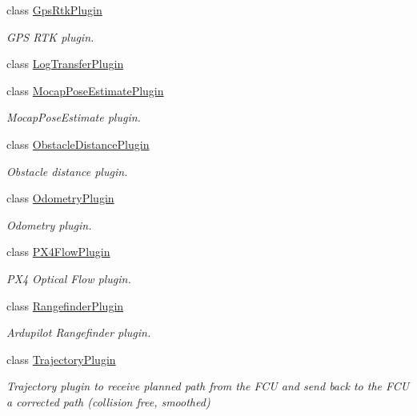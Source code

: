 \begin{DoxyCompactItemize}
class \mbox{\hyperlink{classmavros_1_1extra__plugins_1_1GpsRtkPlugin}{Gps\+Rtk\+Plugin}}
\begin{DoxyCompactList}\small\item\em G\+PS R\+TK plugin. \end{DoxyCompactList}\item 
class \mbox{\hyperlink{classmavros_1_1extra__plugins_1_1LogTransferPlugin}{Log\+Transfer\+Plugin}}
\item 
class \mbox{\hyperlink{classmavros_1_1extra__plugins_1_1MocapPoseEstimatePlugin}{Mocap\+Pose\+Estimate\+Plugin}}
\begin{DoxyCompactList}\small\item\em Mocap\+Pose\+Estimate plugin. \end{DoxyCompactList}\item 
class \mbox{\hyperlink{classmavros_1_1extra__plugins_1_1ObstacleDistancePlugin}{Obstacle\+Distance\+Plugin}}
\begin{DoxyCompactList}\small\item\em Obstacle distance plugin. \end{DoxyCompactList}\item 
class \mbox{\hyperlink{classmavros_1_1extra__plugins_1_1OdometryPlugin}{Odometry\+Plugin}}
\begin{DoxyCompactList}\small\item\em Odometry plugin. \end{DoxyCompactList}\item 
class \mbox{\hyperlink{classmavros_1_1extra__plugins_1_1PX4FlowPlugin}{P\+X4\+Flow\+Plugin}}
\begin{DoxyCompactList}\small\item\em P\+X4 Optical Flow plugin. \end{DoxyCompactList}\item 
class \mbox{\hyperlink{classmavros_1_1extra__plugins_1_1RangefinderPlugin}{Rangefinder\+Plugin}}
\begin{DoxyCompactList}\small\item\em Ardupilot Rangefinder plugin. \end{DoxyCompactList}\item 
class \mbox{\hyperlink{classmavros_1_1extra__plugins_1_1TrajectoryPlugin}{Trajectory\+Plugin}}
\begin{DoxyCompactList}\small\item\em Trajectory plugin to receive planned path from the F\+CU and send back to the F\+CU a corrected path (collision free, smoothed) \end{DoxyCompactList}\item 

\end{DoxyCompactItemize}
